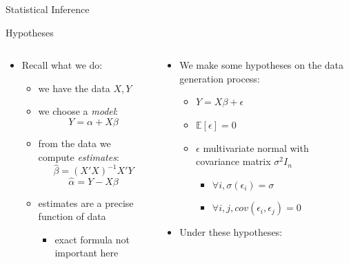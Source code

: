 \documentclass[
  ignorenonframetext,
  aspectratio=169,
]{beamer}
\providecommand{\tightlist}{%
  \setlength{\itemsep}{0pt}\setlength{\parskip}{0pt}}\usepackage{longtable,booktabs,array}
\begin{document}
\begin{frame}{Statistical Inference}
\protect\hypertarget{statistical-inference}{}
\begin{block}{Hypotheses}
\protect\hypertarget{hypotheses}{}
\begin{columns}[T]
\begin{column}{0.48\textwidth}
\begin{itemize}
\item
  Recall what we do:

  \begin{itemize}
  \tightlist
  \item
    we have the data \(X,Y\)
  \item
    we choose a \emph{model}: \[ Y = \alpha + X \beta \]
  \item
    from the data we compute \emph{estimates}:
    \[\hat{\beta}  = (X'X)^{-1} X' Y \] \[\hat{\alpha} = Y- X \beta \]
  \item
    estimates are a precise function of data

    \begin{itemize}
    \tightlist
    \item
      exact formula not important here
    \end{itemize}
  \end{itemize}
\end{itemize}
\end{column}

\begin{column}{0.48\textwidth}
\begin{itemize}
\item
  We make some hypotheses on the data generation process:

  \begin{itemize}
  \tightlist
  \item
    \(Y = X \beta + \epsilon\)
  \item
    \(\mathbb{E}\left[ \epsilon \right] = 0\)
  \item
    \(\epsilon\) multivariate normal with covariance matrix
    \(\sigma^2 I_n\)

    \begin{itemize}
    \tightlist
    \item
      \(\forall i, \sigma(\epsilon_i) = \sigma\)
    \item
      \(\forall i,j, cov(\epsilon_i, \epsilon_j) = 0\)
    \end{itemize}
  \end{itemize}
\item
  Under these hypotheses:


\end{itemize}
\end{column}
\end{columns}
\end{block}
\end{frame}
\end{document}
